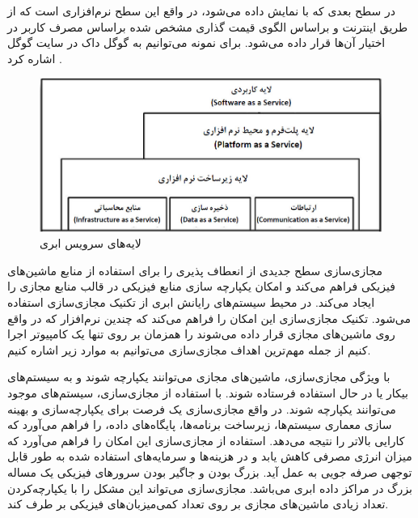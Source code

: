  در سطح بعدی که با 
 نمایش داده می‌شود، در واقع این سطح نرم‌افزاری است که از طریق اینترنت و براساس الگوی قیمت گذاری مشخص شده براساس مصرف کاربر در اختیار آن‌ها قرار داده می‌شود. برای نمونه می‌توانیم به گوگل داک در سایت گوگل اشاره کرد
  \cite{num3,num4}.
   \begin{figure}
	\includegraphics[width=1\textwidth]{files/layers.jpg}
	\caption{لایه‌های سرویس ابری}
\end{figure}
مجازی‌سازی سطح جدیدی از انعطاف پذیری را برای استفاده از منابع ماشین‌های فیزیکی
 فراهم می‌کند و امکان یکپارچه سازی منابع فیزیکی   در قالب منابع مجازی  را ایجاد می‌کند. در محیط سیستم‌های رایانش ابری از تکنیک مجازی‌سازی استفاده می‌شود. تکنیک مجازی‌سازی این امکان را فراهم می‌کند که چندین نرم‌افزار که در واقع روی ماشین‌های مجازی
 قرار داده می‌شوند را همزمان بر روی تنها یک کامپیوتر اجرا کنیم از جمله مهم‌ترین اهداف مجازی‌سازی می‌توانیم به موارد زیر اشاره کنیم.

با ویژگی مجازی‌سازی، ماشین‌های مجازی می‌توانند یکپارچه شوند و به سیستم‌های بیکار یا در حال استفاده فرستاده شوند. با استفاده از مجازی‌سازی، سیستم‌های موجود می‌توانند یکپارچه شوند. در واقع مجازی‌سازی یک فرصت برای یکپارچه‌سازی و بهینه سازی معماری سیستم‌ها، زیرساخت برنامه‌ها، پایگاه‌های داده، را فراهم می‌آورد که کارایی بالاتر را نتیجه می‌دهد.
 استفاده از مجازی‌سازی این امکان را فراهم می‌آورد که میزان انرژی مصرفی کاهش یابد و در هزینه‌ها و سرمایه‌های استفاده شده به طور قابل توجهی صرفه جویی به عمل آید.
  بزرگ بودن و جاگیر بودن سرورهای فیزیکی یک مساله بزرگ در مراکز داده ابری می‌باشد. مجازی‌سازی می‌تواند این مشکل را با یکپارچه‌کردن تعداد زیادی ماشین‌های مجازی بر روی تعداد کمی‌میزبان‌های فیزیکی بر طرف کند.
  
